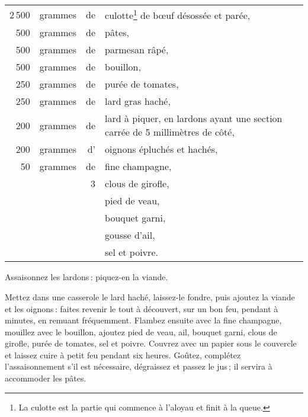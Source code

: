 \footnotesize
\begin{longtable}{rrrp{16em}}
  2 500 & grammes & de & culotte\footnote{ La culotte est la partie qui commence à
                          l'aloyau et finit à la queue.} de bœuf désossée et parée,                       \\
    500 & grammes & de & pâtes,                                                                           \\
    500 & grammes & de & parmesan râpé,                                                                   \\
    500 & grammes & de & bouillon,                                                                        \\
    250 & grammes & de & purée de tomates,                                                                \\
    250 & grammes & de & lard gras haché,                                                                 \\
    200 & grammes & de & lard à piquer, en lardons ayant une section carrée de 5 millimètres de côté,     \\
    200 & grammes & d' & oignons épluchés et hachés,                                                      \\
     50 & grammes & de & fine champagne,                                                                  \\
        &         &  3 & clous de girofle,                                                                \\
        &         &    & pied de veau,                                                                    \\
        &         &    & bouquet garni,                                                                   \\
        &         &    & gousse d'ail,                                                                    \\
        &         &    & sel et poivre.                                                                   \\
\end{longtable}
\normalsize

Assaisonnez les lardons : piquez-en la viande.

Mettez dans une casserole le lard haché, laissez-le fondre, puis ajoutez la
viande et les oignons : faites revenir le tout à découvert, sur un bon feu,
pendant {\mmm} à {\mmm} minutes, en remuant fréquemment. Flambez
ensuite avec la fine champagne, mouillez avec le bouillon, ajoutez pied de
veau, ail, bouquet garni, clous de girofle, purée de tomates, sel et poivre.
Couvrez avec un papier sous le couvercle et laissez cuire à petit feu pendant
six heures. Goûtez, complétez l'assaisonnement s'il est nécessaire, dégraissez
et passez le jus ; il servira à accommoder les pâtes.

